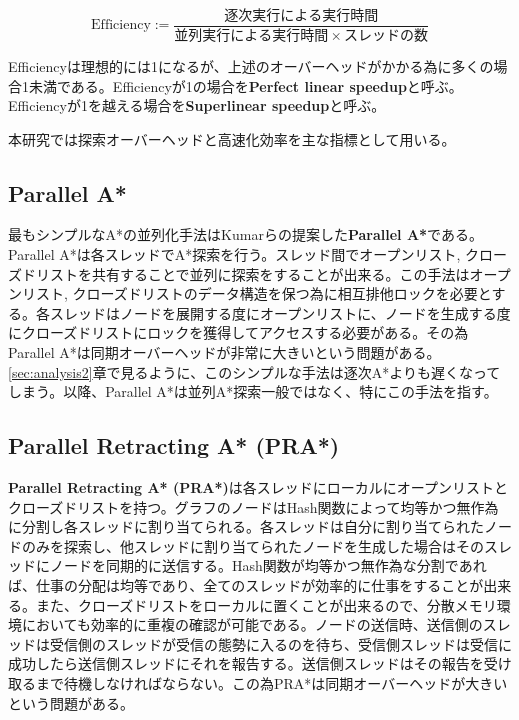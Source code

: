 \documentclass[uplatex]{jsarticle}
\begin{document}
\begin{equation}
	\mbox{Efficiency} := \frac{逐次実行による実行時間}{並列実行による実行時間 \times スレッドの数} 
\end{equation}

Efficiencyは理想的には1になるが、上述のオーバーヘッドがかかる為に多くの場合1未満である。Efficiencyが1の場合を\textbf{Perfect linear speedup}と呼ぶ。Efficiencyが1を越える場合を\textbf{Superlinear speedup}と呼ぶ。

本研究では探索オーバーヘッドと高速化効率を主な指標として用いる。

\subsection{Parallel A*}
最もシンプルなA*の並列化手法はKumarらの提案した\textbf{Parallel A*}である\cite{Kumar1988parallel}。Parallel A*は各スレッドでA*探索を行う。スレッド間でオープンリスト, クローズドリストを共有することで並列に探索をすることが出来る。この手法はオープンリスト, クローズドリストのデータ構造を保つ為に相互排他ロックを必要とする。各スレッドはノードを展開する度にオープンリストに、ノードを生成する度にクローズドリストにロックを獲得してアクセスする必要がある。その為Parallel A*は同期オーバーヘッドが非常に大きいという問題がある。\ref{sec:analysis2}章で見るように、このシンプルな手法は逐次A*よりも遅くなってしまう。以降、Parallel A*は並列A*探索一般ではなく、特にこの手法を指す。


\subsection{Parallel Retracting A* (PRA*)}
\textbf{Parallel Retracting A* (PRA*)}は各スレッドにローカルにオープンリストとクローズドリストを持つ\cite{evett1995massively}。グラフのノードはHash関数によって均等かつ無作為に分割し各スレッドに割り当てられる。各スレッドは自分に割り当てられたノードのみを探索し、他スレッドに割り当てられたノードを生成した場合はそのスレッドにノードを同期的に送信する。Hash関数が均等かつ無作為な分割であれば、仕事の分配は均等であり、全てのスレッドが効率的に仕事をすることが出来る。また、クローズドリストをローカルに置くことが出来るので、分散メモリ環境においても効率的に重複の確認が可能である。ノードの送信時、送信側のスレッドは受信側のスレッドが受信の態勢に入るのを待ち、受信側スレッドは受信に成功したら送信側スレッドにそれを報告する。送信側スレッドはその報告を受け取るまで待機しなければならない。この為PRA*は同期オーバーヘッドが大きいという問題がある。
\newline
\end{document}
